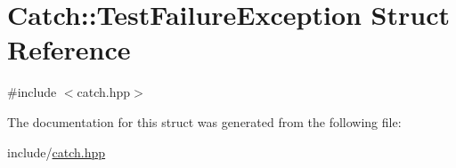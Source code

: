 \hypertarget{structCatch_1_1TestFailureException}{}\section{Catch\+:\+:Test\+Failure\+Exception Struct Reference}
\label{structCatch_1_1TestFailureException}


{\ttfamily \#include $<$catch.\+hpp$>$}



The documentation for this struct was generated from the following file\+:\begin{DoxyCompactItemize}
\item 
include/\mbox{\hyperlink{catch_8hpp}{catch.\+hpp}}\end{DoxyCompactItemize}
